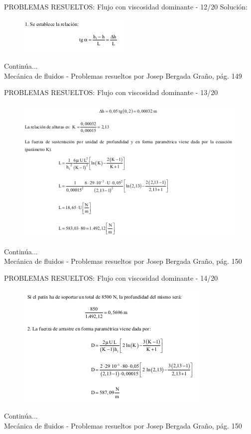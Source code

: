 \begin{frame}{PROBLEMAS RESUELTOS: Flujo con viscosidad dominante - 12/20}
\justifying
Solución:
\begin{figure}[H]
\centering
\includegraphics[scale=0.5]{Section_Files/S2-imagenes-Jhon/Book-ProbResuelts/P40-E02.png}
\end{figure}
Continúa...\\
{\tiny Mecánica de fluidos - Problemas resueltos por Josep Bergada Graño, pág. 149}
\end{frame}

\begin{frame}{PROBLEMAS RESUELTOS: Flujo con viscosidad dominante - 13/20}
\justifying
\begin{figure}[H]
\centering
\includegraphics[scale=0.5]{Section_Files/S2-imagenes-Jhon/Book-ProbResuelts/P40-E03.png}
\end{figure}
Continúa...\\
{\tiny Mecánica de fluidos - Problemas resueltos por Josep Bergada Graño, pág. 150}
\end{frame}

\begin{frame}{PROBLEMAS RESUELTOS: Flujo con viscosidad dominante - 14/20}
\justifying
\begin{figure}[H]
\centering
\includegraphics[scale=0.5]{Section_Files/S2-imagenes-Jhon/Book-ProbResuelts/P40-E04.png}
\end{figure}
Continúa...\\
{\tiny Mecánica de fluidos - Problemas resueltos por Josep Bergada Graño, pág. 150}
\end{frame}

